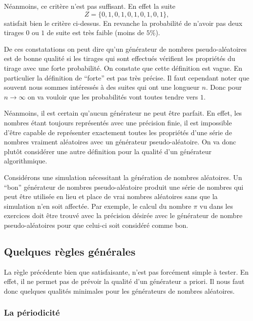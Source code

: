 \documentclass[a4paper,12pt]{book}
\begin{document}
Néanmoins, ce critère n'est pas suffisant. En effet la suite
\begin{equation}
 Z=\{0,1,0,1,0,1,0,1,0,1\},
\end{equation}
satisfait bien le critère ci-dessus. En revanche la probabilité de n'avoir pas deux tirages 
$0$ ou $1$ de suite est très faible (moins de $5\%$). 

De ces constatations on peut dire qu'un générateur de nombres pseudo-aléatoires est de bonne
qualité si les tirages qui sont effectués vérifient les propriétés du tirage 
avec une forte probabilité. On constate que cette définition est vague. En particulier
la définition de ``forte'' est pas très précise. Il faut cependant noter que
souvent nous sommes intéressés à des suites qui ont une longueur $n$. 
Donc pour $n\rightarrow\infty$ on va vouloir que les probabilités vont 
toutes tendre vers $1$. 

Néanmoins, il est certain qu'aucun générateur ne peut être parfait. En effet,
les nombres étant toujours représentés avec une précision finie, il est impossible
d'être capable de représenter exactement toutes les propriétés d'une série de nombres
vraiment aléatoires avec un générateur pseudo-aléatoire. On va donc plutôt
considérer une autre définition pour la qualité d'un générateur algorithmique.

Considérons une simulation nécessitant la génération de nombres aléatoires.
Un ``bon'' générateur de nombres pseudo-aléatoire produit une série de nombres
qui peut être utilisée en lieu et place de vrai nombres aléatoires sans que la simulation
n'en soit affectée. Par exemple, le calcul du nombre $\pi$ vu dans les exercices doit 
être trouvé avec la précision désirée avec le générateur de nombre pseudo-aléatoires pour que celui-ci 
soit considéré comme bon.

\subsection{Quelques règles générales}

La règle précédente bien que satisfaisante, n'est pas forcément simple à tester. En effet,
il ne permet pas de prévoir la qualité d'un générateur a priori. Il nous faut donc quelques 
qualités minimales pour les générateurs de nombres aléatoires.

\subsubsection{La périodicité}
\end{document}
